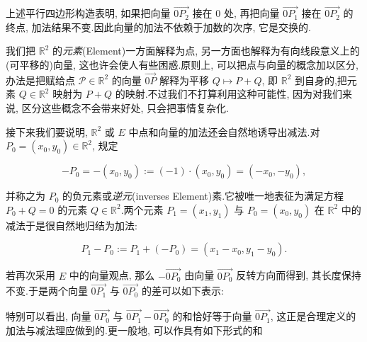 上述平行四边形构造表明, 如果把向量 $\overrightarrow{0P_2}$ 接在 $0$ 处, 再把向量 $\overrightarrow{0P_1}$ 接在 $\overrightarrow{0P_2}$ 的终点, 加法结果不变.因此向量的加法不依赖于加数的次序, 它是交换的.

我们把 $\mathbb{R}^2$ 的\emph{元素}(\textup{Element})一方面解释为点, 另一方面也解释为有向线段意义上的(可平移的)向量, 这也许会使人有些困惑.原则上, 可以把点与向量的概念加以区分, 办法是把赋给点 $\mathcal{P} \in \mathbb{R}^2$ 的向量 $\overrightarrow{0P}$ 解释为平移 $Q \longmapsto P + Q$, 即 $\mathbb{R}^2$ 到自身的,把元素 $Q \in \mathbb{R}^2$ 映射为 $P + Q$ 的映射.不过我们不打算利用这种可能性, 因为对我们来说, 区分这些概念不会带来好处, 只会把事情复杂化.

接下来我们要说明, $\mathbb{R}^2$ 或 $E$ 中点和向量的加法还会自然地诱导出减法.对 $P_0 = (x_0, y_0) \in \mathbb{R}^2$, 规定

\[
-P_0 = -(x_0, y_0) := (-1) \cdot (x_0, y_0) = (-x_0, -y_0),
\]

并称之为 $P_0$ 的负元素或\emph{逆元}(\textup{inverses Element})素.它被唯一地表征为满足方程 $P_0 + Q = 0$ 的元素 $Q \in \mathbb{R}^2$.两个元素 $P_1 = (x_1, y_1)$ 与 $P_0 = (x_0, y_0)$ 在 $\mathbb{R}^2$ 中的减法于是很自然地归结为加法:

\[
P_1 - P_0 := P_1 + (-P_0) = (x_1 - x_0, y_1 - y_0).
\]

若再次采用 $E$ 中的向量观点, 那么 $-\overrightarrow{0P_0}$ 由向量 $\overrightarrow{0P_0}$ 反转方向而得到, 其长度保持不变.于是两个向量 $\overrightarrow{0P_1}$ 与 $\overrightarrow{0P_0}$ 的差可以如下表示:

\begin{center}
\end{center}

特别可以看出, 向量 $\overrightarrow{0P_0}$ 与 $\overrightarrow{0P_1} - \overrightarrow{0P_0}$ 的和恰好等于向量 $\overrightarrow{0P_1}$, 这正是合理定义的加法与减法理应做到的.更一般地, 可以作具有如下形式的和

